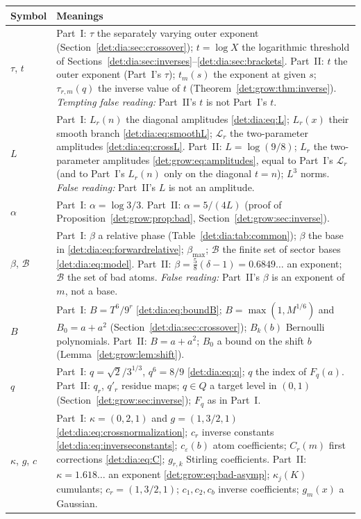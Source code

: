 \documentclass[11pt,letterpaper]{article}
\numberwithin{equation}{section}
\theoremstyle{definition}\newtheorem{definition}[theorem]{Definition}
\theoremstyle{remark}\newtheorem{remark}[theorem]{Remark}
\newcommand{\eps}{\varepsilon}
\begin{document}
\begin{longtable}{@{}>{\raggedright\arraybackslash}p{} >{\raggedright\arraybackslash}p{}@{}}
\toprule
Symbol & Meanings\\
\midrule
\endhead
$\tau$, $t$ & Part~I: $\tau$ the separately varying outer exponent (Section~\ref{det:dia:sec:crossover}); $t=\log X$ the logarithmic threshold of Sections~\ref{det:dia:sec:inverses}--\ref{det:dia:sec:brackets}. Part~II: $t$ the outer exponent (Part~I's $\tau$); $t_m(s)$ the exponent at given $s$; $\tau_{r,m}(q)$ the inverse value of $t$ (Theorem~\ref{det:grow:thm:inverse}). \emph{Tempting false reading:} Part~II's $t$ is not Part~I's $t$.\\
$L$ & Part~I: $L_r(n)$ the diagonal amplitudes \eqref{det:dia:eq:L}; $L_r(x)$ their smooth branch \eqref{det:dia:eq:smoothL}; $\mathcal L_r$ the two-parameter amplitudes \eqref{det:dia:eq:crossL}. Part~II: $L=\log(9/8)$; $L_r$ the two-parameter amplitudes \eqref{det:grow:eq:amplitudes}, equal to Part~I's $\mathcal L_r$ (and to Part~I's $L_r(n)$ only on the diagonal $t=n$); $L^3$ norms. \emph{False reading:} Part~II's $L$ is not an amplitude.\\
$\alpha$ & Part~I: $\alpha=\log3/3$. Part~II: $\alpha=5/(4L)$ (proof of Proposition~\ref{det:grow:prop:bad}, Section~\ref{det:grow:sec:inverse}).\\
$\beta$, $\mathcal B$ & Part~I: $\beta$ a relative phase (Table~\ref{det:dia:tab:common}); $\beta$ the base in \eqref{det:dia:eq:forwardrelative}; $\beta_{\max}$; $\mathcal B$ the finite set of sector bases \eqref{det:dia:eq:model}. Part~II: $\beta=\frac58(\delta-1)=0.6849\ldots$ an exponent; $\mathcal B$ the set of bad atoms. \emph{False reading:} Part~II's $\beta$ is an exponent of $m$, not a base.\\
$B$ & Part~I: $B=T^6/9^r$ \eqref{det:dia:eq:boundB}; $B=\max(1,M^{1/6})$ and $B_0=a+a^2$ (Section~\ref{det:dia:sec:crossover}); $B_k(b)$ Bernoulli polynomials. Part~II: $B=a+a^2$; $B_0$ a bound on the shift $b$ (Lemma~\ref{det:grow:lem:shift}).\\
$q$ & Part~I: $q=\sqrt2/3^{1/3}$, $q^6=8/9$ \eqref{det:dia:eq:q}; $q$ the index of $F_q(a)$. Part~II: $q_r$, $q'_r$ residue maps; $q\in Q$ a target level in $(0,1)$ (Section~\ref{det:grow:sec:inverse}); $F_q$ as in Part~I.\\
$\kappa$, $g$, $c$ & Part~I: $\kappa=(0,2,1)$ and $g=(1,3/2,1)$ \eqref{det:dia:eq:crossnormalization}; $c_r$ inverse constants \eqref{det:dia:eq:inverseconstants}; $c_\eps(b)$ atom coefficients; $C_r(m)$ first corrections \eqref{det:dia:eq:C}; $g_{r,k}$ Stirling coefficients. Part~II: $\kappa=1.618\ldots$ an exponent \eqref{det:grow:eq:bad-asymp}; $\kappa_j(K)$ cumulants; $c_r=(1,3/2,1)$; $c_1,c_2,c_b$ inverse coefficients; $g_m(x)$ a Gaussian.\\

\end{longtable}
\end{document}
